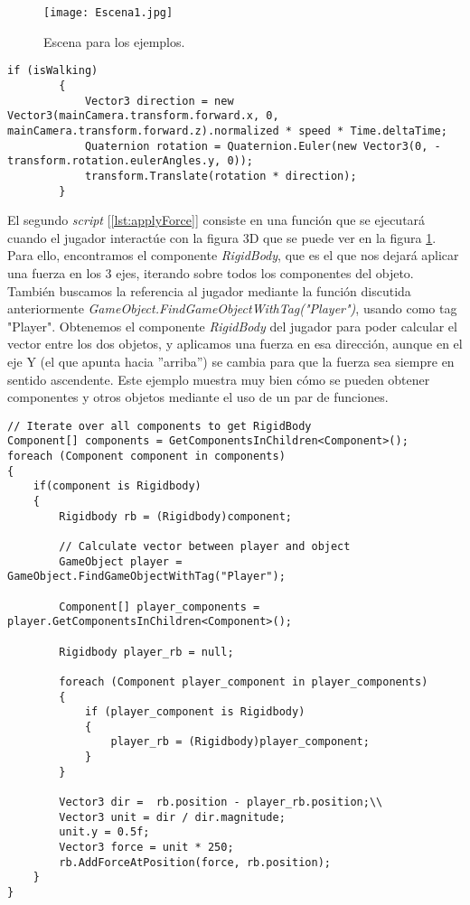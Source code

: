 \documentclass{pre-tfg}
\begin{document}
\begin{figure}[htb]
	\centering
	\texttt{[image: Escena1.jpg]}
	\caption{Escena para los ejemplos.}
	\label{fig:Escena1}
\end{figure}

\begin{spacing}{1}
\begin{lstlisting}[float=htbp, caption=Translación y rotación del jugador en el movimiento automático, label=lst:autowalk]
if (isWalking)
        {
            Vector3 direction = new Vector3(mainCamera.transform.forward.x, 0, mainCamera.transform.forward.z).normalized * speed * Time.deltaTime;
            Quaternion rotation = Quaternion.Euler(new Vector3(0, -transform.rotation.eulerAngles.y, 0));
            transform.Translate(rotation * direction);
        }
\end{lstlisting}
\end{spacing}


El segundo \textit{script} [\ref{lst:applyForce}] consiste en una función que se ejecutará cuando el jugador interactúe con la figura 3D que se puede ver en la figura \ref{fig:Escena1}. Para ello, encontramos el componente \textit{RigidBody}, que es el que nos dejará aplicar una fuerza en los 3 ejes, iterando sobre todos los componentes del objeto. También buscamos la referencia al jugador mediante la función discutida anteriormente \textit{GameObject.FindGameObjectWithTag("Player")}, usando como tag "Player". Obtenemos el componente \textit{RigidBody} del jugador para poder calcular el vector entre los dos objetos, y aplicamos una fuerza en esa dirección, aunque en el eje Y (el que apunta hacia ''arriba'') se cambia para que la fuerza sea siempre en sentido ascendente. Este ejemplo muestra muy bien cómo se pueden obtener componentes y otros objetos mediante el uso de un par de funciones.

\begin{spacing}{1}
\begin{lstlisting}[float=htbp, caption=Aplicación de una fuerza a un objeto con físicas, label=lst:applyForce]
// Iterate over all components to get RigidBody
Component[] components = GetComponentsInChildren<Component>();
foreach (Component component in components)
{
	if(component is Rigidbody)
	{
		Rigidbody rb = (Rigidbody)component;

		// Calculate vector between player and object
		GameObject player = GameObject.FindGameObjectWithTag("Player");

		Component[] player_components = player.GetComponentsInChildren<Component>();

		Rigidbody player_rb = null;

		foreach (Component player_component in player_components)
		{
			if (player_component is Rigidbody)
			{
				player_rb = (Rigidbody)player_component;
			}
		}

		Vector3 dir =  rb.position - player_rb.position;\\
		Vector3 unit = dir / dir.magnitude;
		unit.y = 0.5f;
		Vector3 force = unit * 250;
		rb.AddForceAtPosition(force, rb.position);
	}
}
\end{lstlisting}
\end{spacing}
\end{document}
